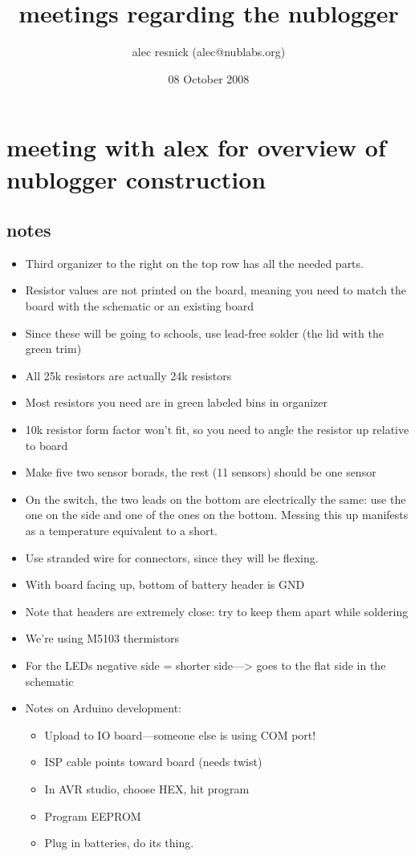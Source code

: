 \documentclass{article}
\begin{document}
\title{meetings regarding the nublogger}
\author{alec resnick (alec@nublabs.org)}
\date{08 October 2008}

\maketitle



\section{meeting with alex for overview of nublogger construction}

\subsection{notes}

\begin{itemize}
\item Third organizer to the right on the top row has all the needed parts.
\item Resistor values are not printed on the board, meaning you need to match the board with the schematic or an existing board
\item Since these will be going to schools, use lead-free solder (the lid with the green trim)
\item All 25k resistors are actually 24k resistors
\item Most resistors you need are in green labeled bins in organizer
\item 10k resistor form factor won't fit, so you need to angle the resistor up relative to board
\item Make five two sensor borads, the rest (11 sensors) should be one sensor
\item On the switch, the two leads on the bottom are electrically the same: use the one on the side and one of the ones on the bottom.  Messing this up manifests as a temperature equivalent to a short.
\item Use stranded wire for connectors, since they will be flexing.
\item With board facing up, bottom of battery header is GND
\item Note that headers are extremely close: try to keep them apart while soldering
\item We're using M5103 thermistors
\item For the LEDs negative side = shorter side---\textgreater{} goes to the flat side in the schematic
\item Notes on Arduino development:

\begin{itemize}
\item Upload to IO board---someone else is using COM port!
\item ISP cable points toward board (needs twist)
\item In AVR studio, choose HEX, hit program
\item Program EEPROM
\item Plug in batteries, do its thing.
\end{itemize}
\end{itemize}
\end{document}

